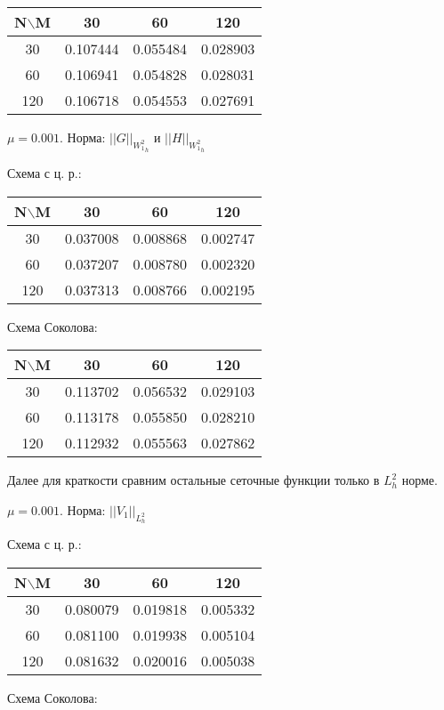 \documentclass[specialist,subf,href,colorlinks=true,14pt,times,mtpro]{disser}
\begin{document}
\begin{tabular}{|c|c|c|c|}
    \hline
    N$\backslash$M & 30 & 60 & 120 \\
    \hline
    30 & 0.107444 & 0.055484 & 0.028903 \\
    \hline
    60 & 0.106941 & 0.054828 & 0.028031 \\
    \hline
    120 & 0.106718 & 0.054553 & 0.027691 \\
    \hline
\end{tabular}
\newpage
$\mu = 0.001.$ Норма:  $||G||_{{W^2_1}_h}$ и $||H||_{{W^2_1}_h}$

Схема с ц. р.:

\begin{tabular}{|c|c|c|c|}
    \hline
    N$\backslash$M & 30 & 60 & 120 \\
    \hline
    30 &   0.037008 & 0.008868 & 0.002747 \\
    \hline
    60 & 0.037207 & 0.008780 & 0.002320 \\
    \hline
    120 & 0.037313 & 0.008766 & 0.002195 \\
    \hline
\end{tabular}
\BlankLine
Схема Соколова:

\begin{tabular}{|c|c|c|c|}
    \hline
    N$\backslash$M & 30 & 60 & 120 \\
    \hline
    30 & 0.113702 & 0.056532 & 0.029103 \\
    \hline
    60 & 0.113178 & 0.055850 & 0.028210 \\
    \hline
    120 & 0.112932 & 0.055563 & 0.027862 \\
    \hline
\end{tabular}
\BlankLine
\BlankLine
\BlankLine
Далее для краткости сравним остальные сеточные функции только в $L^2_h$ норме.

$\mu = 0.001.$ Норма:  $||V_1||_{L^2_h}$

Схема с ц. р.:

\begin{tabular}{|c|c|c|c|}
    \hline
    N$\backslash$M & 30 & 60 & 120 \\
    \hline
    30 &   0.080079 & 0.019818 & 0.005332 \\
    \hline
    60 & 0.081100 & 0.019938 & 0.005104 \\
    \hline
    120 & 0.081632 & 0.020016 & 0.005038 \\
    \hline
\end{tabular}
\BlankLine
Схема Соколова:
\end{document}
